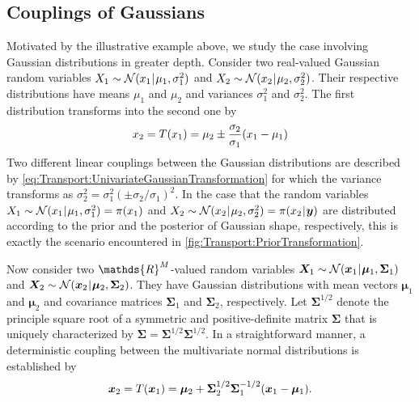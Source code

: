 \subsection{Couplings of Gaussians}
Motivated by the illustrative example above, we study the case involving Gaussian distributions in greater depth.
Consider two real-valued Gaussian random variables \(X_1 \sim \mathcal{N}(x_1 {\:\!}|{\:\!} \mu_1, \sigma_1^2)\) and \(X_2 \sim \mathcal{N}(x_2 {\:\!}|{\:\!} \mu_2, \sigma_2^2)\).
Their respective distributions have means \(\mu_1\) and \(\mu_2\) and variances \(\sigma_1^2\) and \(\sigma_2^2\).
The first distribution transforms into the second one by
\begin{equation} \label{eq:Transport:UnivariateGaussianTransformation}
  x_2 = T(x_1) = \mu_2 \pm \frac{\sigma_2}{\sigma_1}(x_1 - \mu_1)
\end{equation}
Two different linear couplings between the Gaussian distributions are described by \cref{eq:Transport:UnivariateGaussianTransformation}
for which the variance transforms as \(\sigma_2^2 = \sigma_1^2 (\pm \sigma_2 / \sigma_1)^2\).
In the case that the random variables \(X_1 \sim \mathcal{N}(x_1 {\:\!}|{\:\!} \mu_1, \sigma_1^2) = \pi(x_1)\) and \(X_2 \sim \mathcal{N}(x_2 {\:\!}|{\:\!} \mu_2, \sigma_2^2) = \pi(x_2 {\:\!}|{\:\!} \bm{y})\)
are distributed according to the prior and the posterior of Gaussian shape, respectively, this is exactly the scenario encountered in \cref{fig:Transport:PriorTransformation}.
\par %
Now consider two \(\mathds{R}^\dimParam\)-valued random variables \(\bm{X}_1 \sim \mathcal{N}(\bm{x}_1 {\:\!}|{\:\!} \bm{\mu}_1,\bm{\Sigma}_1)\)
and \(\bm{X}_2 \sim \mathcal{N}(\bm{x}_2 {\:\!}|{\:\!} \bm{\mu}_2,\bm{\Sigma}_2)\).
They have Gaussian distributions with mean vectors \(\bm{\mu}_1\) and \(\bm{\mu}_2\) and covariance matrices \(\bm{\Sigma}_1\) and \(\bm{\Sigma}_2\), respectively.
Let \(\bm{\Sigma}^{1/2}\) denote the principle square root of a symmetric and positive-definite matrix \(\bm{\Sigma}\)
that is uniquely characterized by \(\bm{\Sigma} = \bm{\Sigma}^{1/2} \bm{\Sigma}^{1/2}\).
In a straightforward manner, a deterministic coupling between the multivariate normal distributions is established by
\begin{equation} \label{eq:Transport:StandardGaussianCoupling}
  \bm{x}_2 = T(\bm{x}_1) = \bm{\mu}_2 + \bm{\Sigma}_2^{1/2} \bm{\Sigma}_1^{-1/2}(\bm{x}_1 - \bm{\mu}_1).
\end{equation}
